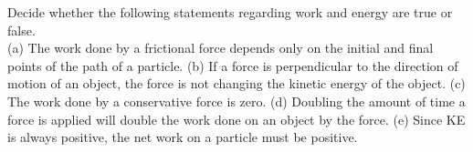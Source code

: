 Decide whether the following statements regarding work and energy are true or false.\\
%
(a) The work done by a frictional force depends only on the initial
and final points of the path of a particle.\hwendpart
%
(b) If a force is perpendicular to the direction of motion of an
object, the force is not changing the kinetic energy of the
object.\hwendpart
%
(c) The work done by a conservative force is zero.\hwendpart
%
(d) Doubling the amount of time a force is applied will double the
work done on an object by the force.\hwendpart
%
(e) Since KE is always positive, the net work on a particle must be
positive.

